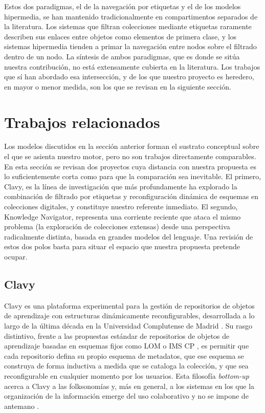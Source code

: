 Estos dos paradigmas, el de la navegación por etiquetas y el de los modelos hipermedia, se han
mantenido tradicionalmente en compartimentos separados de la literatura. Los sistemas que filtran
colecciones mediante etiquetas raramente describen sus enlaces entre objetos como elementos de
primera clase, y los sistemas hipermedia tienden a primar la navegación entre nodos sobre el
filtrado dentro de un nodo. La síntesis de ambos paradigmas, que es donde se sitúa nuestra
contribución, no está extensamente cubierta en la literatura. Los trabajos que sí han abordado esa
intersección, y de los que nuestro proyecto es heredero, en mayor o menor medida, son los que se revisan
en la siguiente sección.

\section{Trabajos relacionados}
\label{sec:trabajosRelacionados}

Los modelos discutidos en la sección anterior forman el sustrato conceptual sobre el que se asienta
nuestro motor, pero no son trabajos directamente comparables. En esta sección se revisan dos
proyectos cuya distancia con nuestra propuesta es lo suficientemente corta como para que la
comparación sea inevitable. El primero, Clavy, es la línea de investigación que más profundamente
ha explorado la combinación de filtrado por etiquetas y reconfiguración dinámica de esquemas en
colecciones digitales, y constituye nuestro referente inmediato. El segundo, Knowledge Navigator,
representa una corriente reciente que ataca el mismo problema (la exploración de colecciones
extensas) desde una perspectiva radicalmente distinta, basada en grandes modelos del lenguaje. Una
revisión de estos dos polos basta para situar el espacio que nuestra propuesta pretende ocupar.

\subsection{Clavy}
\label{subsec:clavy}

Clavy es una plataforma experimental para la gestión de repositorios de objetos de aprendizaje con
estructuras dinámicamente reconfigurables, desarrollada a lo largo de la última década en la Universidad
Complutense de Madrid \citep{gayoso2016siie}. Su rasgo distintivo, frente a las propuestas estándar
de repositorios de objetos de aprendizaje basadas en esquemas fijos como LOM \citep{ieee_lom_2002}
o IMS CP \citep{ims_cp_2004}, es
permitir que cada repositorio defina su propio esquema de metadatos, que ese esquema se construya
de forma inductiva a medida que se cataloga la colección, y que sea reconfigurable en cualquier momento
por los usuarios. Esta filosofía \textit{bottom-up} acerca a Clavy a las folksonomías y, más en general, a los
sistemas en los que la organización de la información emerge del uso colaborativo y no se impone de
antemano \citep{gayoso2016wise}.

